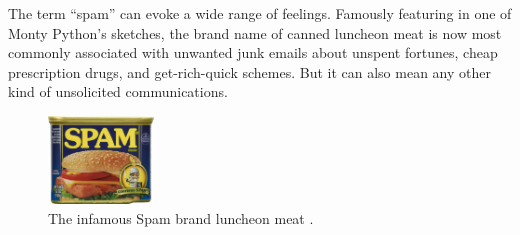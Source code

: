 
% 
\setcounter{page}{1}

The term ``spam'' can evoke a wide range of feelings. Famously featuring in one of Monty Python's sketches, the brand name of canned luncheon meat is now most commonly associated with unwanted junk emails about unspent fortunes, cheap prescription drugs, and get-rich-quick schemes. But it can also mean any other kind of unsolicited communications.
\vspace{-0.5cm}
\\
\begin{figure}
	\centering
	\captionsetup{width=0.3\textwidth}
	\includegraphics[width=0.25\textwidth]{pics/spam}
	\caption{The infamous Spam brand luncheon meat \cite{spamlogo}. }
	\label{fig:spam}
\end{figure}

